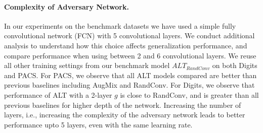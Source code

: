 \paragraph{Complexity of Adversary Network.}
In our experiments on the benchmark datasets we have used a simple fully convolutional network (FCN) with 5 convolutional layers.
We conduct additional analysis to understand how this choice affects generalization performance, and compare performance when using between 2 and 6 convolutional layers.
We reuse all other training settings from our benchmark model $ALT_{RandConv}$ on both Digits and PACS.
For PACS, we observe that all ALT models compared are better than previous baselines including AugMix and RandConv.
For Digits, we observe that performance of ALT with a 2-layer $g$ is close to RandConv, and is greater than all previous baselines for higher depth of the network.
Increasing the number of layers, i.e., increasing the complexity of the adversary network leads to better performance upto 5 layers, even with the same learning rate.


